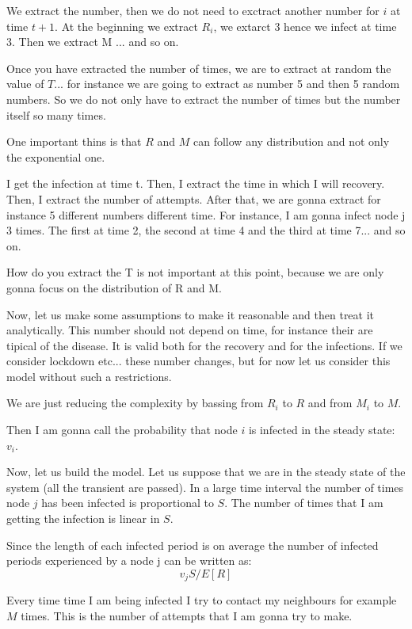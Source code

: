\documentclass[../main/main.tex]{subfiles}
\begin{document}
We extract the number, then we do not need to exctract another number for \( i \) at time \( t + 1 \). At the beginning we extract \( R_i \), we extarct 3 hence we infect at time 3. Then we extract M ... and so on.


Once you have extracted the number of times, we are to extract at random the value of \( T \)... for instance we are going to extract as number 5 and then 5 random numbers. So we do not only have to extract the number of times but the number itself so many times.

One important thins is that \( R \) and \( M \) can follow any distribution and not only the exponential one.


I get the infection at time t. Then, I extract the time in which I will recovery. Then, I extract the number of attempts. After that, we are gonna extract for instance 5 different numbers different time. For instance, I am gonna infect node j 3 times. The first at time 2, the second at time 4 and the third at time 7... and so on.

How do you extract the T is not important at this point, because we are only gonna focus on the distribution of  R and M.


Now, let us make some assumptions to make it reasonable and then treat it analytically. This number should not depend on time, for instance their are tipical of the disease. It is valid both for the recovery and for the infections. If we consider lockdown etc... these number changes, but for now let us consider this model without such a restrictions.

We are just reducing the complexity by bassing from \( R_i  \) to \( R \) and from \( M_i \) to \( M \).

Then I am gonna call the probability that node \( i \) is infected in the steady state: \( v_i \).


Now, let us build the model. Let us suppose that we are in the steady state of the system (all the transient are passed). In a large time interval the number of times node \( j \) has been infected is proportional to \( S \). The number of times that I am getting the infection is linear in \( S \).

Since the length of each infected period is on average the number of infected periods experienced by a node j can be written as:
\begin{equation*}
  v_j S/ E[R]
\end{equation*}


Every time time I am being infected I try to contact my neighbours for example \( M \) times. This is the number of attempts that I am gonna try to make.
\end{document}
